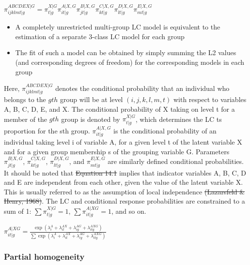 \documentclass[12pt,twoside]{reedthesis}
\providecommand{\tightlist}{%
  \setlength{\itemsep}{0pt}\setlength{\parskip}{0pt}}
\begin{document}
\(\pi_{ijklmt|g}^{ABCDEX|G} = \pi_{t|g}^{X|G} \pi_{it|g}^{A|X,G} \pi_{jt|g}^{B|X,G} \pi_{kt|g}^{C|X,G} \pi_{lt|g}^{D|X,G} \pi_{mt|g}^{E|X,G}\)
\begin{itemize}
\tightlist
\item
  A completely unrestricted multi-group LC model is equivalent to the estimation of a separate 3-class LC model for each group
\item
  The fit of such a model can be obtained by simply summing the L2 values (and corresponding degrees of freedom) for the corresponding models in each group
\end{itemize}
Here, \(\pi_{ijklmt|g}^{ABCDEX|G}\) denotes the conditional probability that an individual who belongs to the \(gth\) group will be at level \((i, j, k, l, m, t)\) with respect to variables A, B, C, D, E, and X. The conditional probability of X taking on level t for a member of the \(gth\) group is denoted by \(\pi_{t|g}^{X|G}\), which determines the LC ts proportion for the sth group. \(\pi_{it|g}^{A|X,G}\) is the conditional probability of an individual taking level i of variable A, for a given level t of the latent variable X and for a given group membership s of the grouping variable G. Parameters \(\pi_{jt|g}^{B|X,G}\), \(\pi_{kt|g}^{C|X,G}\), \(\pi_{lt|g}^{D|X,G}\), and \(\pi_{mt|g}^{E|X,G}\) are similarly defined conditional probabilities. It should be noted that \sout{Equation 14.1} implies that indicator variables A, B, C, D and E are independent from each other, given the value of the latent variable X. This is usually referred to as the assumption of local independence \sout{(Lazarsfeld \& Henry, 1968)}. The LC and conditional response probabilities are constrained to a sum of 1: \(\sum \pi_{t|g}^{X|G} =1\), \(\sum \pi_{it|g}^{A|XG} = 1\), and so on.

\(\pi_{it|g}^{A|XG}=\frac{\exp(\lambda_i^A+\lambda_{it}^{AX}+\lambda_{ig}^{AG}+\lambda_{itg}^{AXG})}{\sum \exp(\lambda_i^A+\lambda_{it}^{AX}+\lambda_{ig}^{AG}+\lambda_{itg}^{AXG})}\)

\hypertarget{partial-homogeneity}{%
\subsubsection{Partial homogeneity}\label{partial-homogeneity}}
\end{document}

